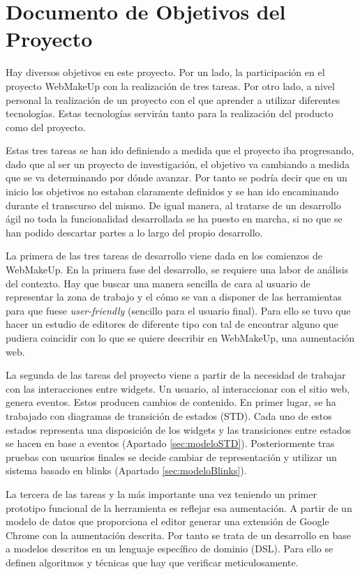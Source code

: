 \chapter{Documento de Objetivos del Proyecto}
\label{cha:DOP}


Hay diversos objetivos en este proyecto. Por un lado, la participación en el proyecto WebMakeUp con la realización de tres tareas. Por otro lado, a nivel personal la realización de un proyecto con el que aprender a utilizar diferentes tecnologías. Estas tecnologías servirán tanto para la realización del producto como del proyecto.

Estas tres tareas se han ido definiendo a medida que el proyecto iba progresando, dado que al ser un proyecto de investigación, el objetivo va cambiando a medida que se va determinando por dónde avanzar. Por tanto se podría decir que en un inicio los objetivos no estaban claramente definidos y se han ido encaminando durante el transcurso del mismo. De igual manera, al tratarse de un desarrollo ágil no toda la funcionalidad desarrollada se ha puesto en marcha, si no que se han podido descartar partes a lo largo del propio desarrollo.

La primera de las tres tareas de desarrollo viene dada en los comienzos de WebMakeUp. En la primera fase del desarrollo, se requiere una labor de análisis del contexto. Hay que buscar una manera sencilla de cara al usuario de representar la zona de trabajo y el cómo se van a disponer de las herramientas para que fuese \emph{user-friendly} (sencillo para el usuario final). Para ello se tuvo que hacer un estudio de editores de diferente tipo con tal de encontrar alguno que pudiera coincidir con lo que se quiere describir en WebMakeUp, una aumentación web.

La segunda de las tareas del proyecto viene a partir de la necesidad de trabajar con las interacciones entre widgets. Un usuario, al interaccionar con el sitio web, genera eventos. Estos producen cambios de contenido. En primer lugar, se ha trabajado con diagramas de transición de estados (STD). Cada uno de estos estados representa una disposición de los widgets y las transiciones entre estados se hacen en base a eventos (Apartado \ref{sec:modeloSTD}). Posteriormente tras pruebas con usuarios finales se decide cambiar de representación y utilizar un sistema basado en blinks (Apartado \ref{sec:modeloBlinks}).

La tercera de las tareas y la más importante una vez teniendo un primer prototipo funcional de la herramienta es reflejar esa aumentación. A partir de un modelo de datos que proporciona el editor generar una extensión de Google Chrome con la aumentación descrita. Por tanto se trata de un desarrollo en base a modelos descritos en un lenguaje específico de dominio (DSL). Para ello se definen algoritmos y técnicas que hay que verificar meticulosamente.

